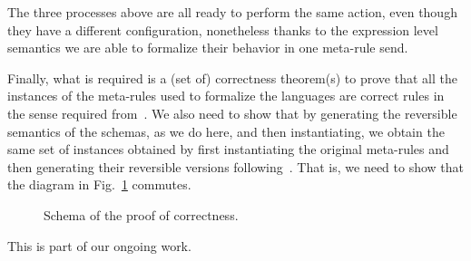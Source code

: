 \documentclass{article}[12pt,a4paper]
\theoremstyle{definition}
\begin{document}
The three processes above are all ready to perform the same action, even though
they have a different configuration, nonetheless thanks to the expression level
semantics we are able to formalize their behavior in one meta-rule send.

Finally, what is required is a (set of) correctness theorem(s) to
prove that all the instances of the meta-rules used to formalize the
languages are correct rules in the sense required
from~\cite{LaneseM20}. We also need to show that by generating the
reversible semantics of the schemas, as we do here, and then
instantiating, we obtain the same set of instances obtained by first
instantiating the original meta-rules and then generating their
reversible versions following~\cite{LaneseM20}. That is, we need to
show that the diagram in Fig.~\ref{fig:square} commutes.

\begin{figure}
  \centering
  \caption{ Schema of the proof of correctness. }
  \label{fig:square}
\end{figure}

This is part of our ongoing work.


\end{document}
